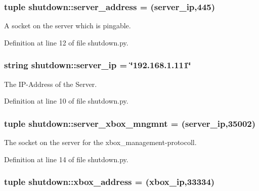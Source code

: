 \hypertarget{namespaceshutdown_a06cedfd6f90aae704fb783a7c26d5766}{
\subsubsection[{server\_\-address}]{\setlength{\rightskip}{0pt plus 5cm}tuple {\bf shutdown::server\_\-address} = ({\bf server\_\-ip},445)}}
\label{namespaceshutdown_a06cedfd6f90aae704fb783a7c26d5766}


A socket on the server which is pingable. 



Definition at line 12 of file shutdown.py.

\hypertarget{namespaceshutdown_a1d57ccf41aa815c697b5e7462788d6ef}{
\subsubsection[{server\_\-ip}]{\setlength{\rightskip}{0pt plus 5cm}string {\bf shutdown::server\_\-ip} = \char`\"{}192.168.1.111\char`\"{}}}
\label{namespaceshutdown_a1d57ccf41aa815c697b5e7462788d6ef}


The IP-\/Address of the Server. 



Definition at line 10 of file shutdown.py.

\hypertarget{namespaceshutdown_acbd52c2f88522e549aae89f6cc542155}{
\subsubsection[{server\_\-xbox\_\-mngmnt}]{\setlength{\rightskip}{0pt plus 5cm}tuple {\bf shutdown::server\_\-xbox\_\-mngmnt} = ({\bf server\_\-ip},35002)}}
\label{namespaceshutdown_acbd52c2f88522e549aae89f6cc542155}


The socket on the server for the xbox\_\-management-\/protocoll. 



Definition at line 14 of file shutdown.py.

\hypertarget{namespaceshutdown_a13b0427c044e6d8765191d9e858ff627}{
\subsubsection[{xbox\_\-address}]{\setlength{\rightskip}{0pt plus 5cm}tuple {\bf shutdown::xbox\_\-address} = ({\bf xbox\_\-ip},33334)}}
\label{namespaceshutdown_a13b0427c044e6d8765191d9e858ff627}


